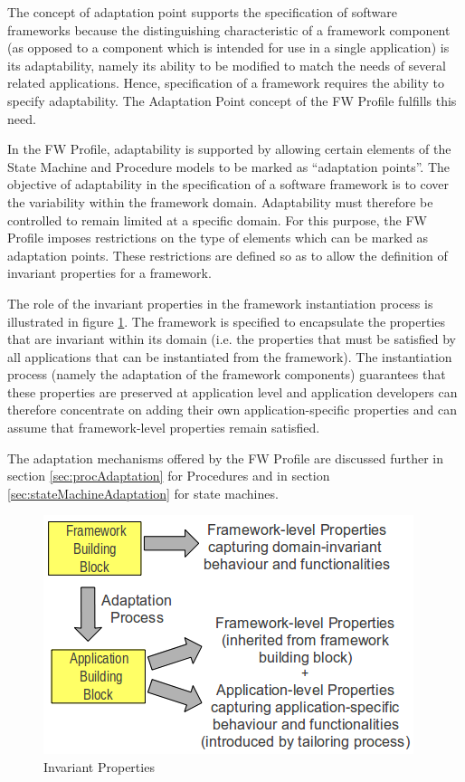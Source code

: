 \documentclass[a4paper,10pt]{article}
\begin{document}
The concept of adaptation point supports the specification of software frameworks because the distinguishing characteristic of a framework component (as opposed to a component which is intended for use in a single application) is its adaptability, namely its ability to be modified to match the needs of several related applications. Hence, specification of a framework requires the ability to specify adaptability. The Adaptation Point concept of the FW Profile fulfills this need.

In the FW Profile, adaptability is supported by allowing certain elements of the State Machine and Procedure models to be marked as “adaptation points”. The objective of adaptability in the specification of a software framework is to cover the variability within the framework domain. Adaptability must therefore be controlled to remain limited at a specific domain. For this purpose, the FW Profile imposes restrictions on the type of elements which can be marked as adaptation points. These restrictions are defined so as to allow the definition of invariant properties for a framework.

The role of the invariant properties in the framework instantiation process is illustrated in
figure \ref{fig:InvariantProperties}. The framework is specified to encapsulate the properties that are invariant within its domain (i.e. the properties that must be satisfied by all applications that can be instantiated from the framework). The instantiation process (namely the adaptation of the framework components) guarantees that these properties are preserved at application level and application developers can therefore concentrate on adding their own application-specific properties and can assume that framework-level properties remain satisfied. 

The adaptation mechanisms offered by the FW Profile are discussed further in section \ref{sec:procAdaptation} for Procedures and in section \ref{sec:stateMachineAdaptation} for state machines.

\begin{figure}[H]
 \centering
 \includegraphics[scale=0.45,keepaspectratio=true]{../images/FW_Adaptation.png}
 \caption{Invariant Properties}
 \label{fig:InvariantProperties}
\end{figure}
\end{document}
